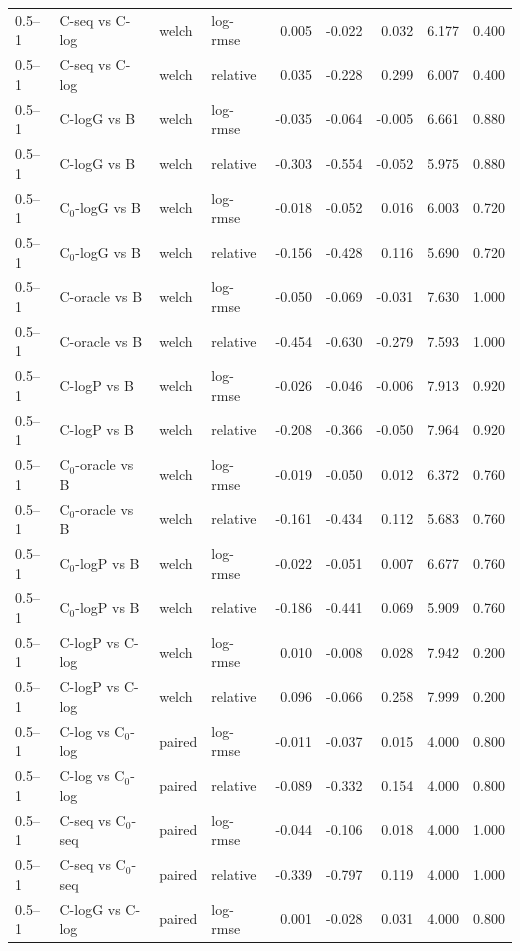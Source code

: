 \begin{longtable}{llllrrrrr}
0.5–1 & C-seq vs C-log & welch & log-rmse & 0.005 & -0.022 & 0.032 & 6.177 & 0.400 \\
0.5–1 & C-seq vs C-log & welch & relative & 0.035 & -0.228 & 0.299 & 6.007 & 0.400 \\
0.5–1 & C-logG vs B & welch & log-rmse & -0.035 & -0.064 & -0.005 & 6.661 & 0.880 \\
0.5–1 & C-logG vs B & welch & relative & -0.303 & -0.554 & -0.052 & 5.975 & 0.880 \\
0.5–1 & C$_0$-logG vs B & welch & log-rmse & -0.018 & -0.052 & 0.016 & 6.003 & 0.720 \\
0.5–1 & C$_0$-logG vs B & welch & relative & -0.156 & -0.428 & 0.116 & 5.690 & 0.720 \\
0.5–1 & C-oracle vs B & welch & log-rmse & -0.050 & -0.069 & -0.031 & 7.630 & 1.000 \\
0.5–1 & C-oracle vs B & welch & relative & -0.454 & -0.630 & -0.279 & 7.593 & 1.000 \\
0.5–1 & C-logP vs B & welch & log-rmse & -0.026 & -0.046 & -0.006 & 7.913 & 0.920 \\
0.5–1 & C-logP vs B & welch & relative & -0.208 & -0.366 & -0.050 & 7.964 & 0.920 \\
0.5–1 & C$_0$-oracle vs B & welch & log-rmse & -0.019 & -0.050 & 0.012 & 6.372 & 0.760 \\
0.5–1 & C$_0$-oracle vs B & welch & relative & -0.161 & -0.434 & 0.112 & 5.683 & 0.760 \\
0.5–1 & C$_0$-logP vs B & welch & log-rmse & -0.022 & -0.051 & 0.007 & 6.677 & 0.760 \\
0.5–1 & C$_0$-logP vs B & welch & relative & -0.186 & -0.441 & 0.069 & 5.909 & 0.760 \\
0.5–1 & C-logP vs C-log & welch & log-rmse & 0.010 & -0.008 & 0.028 & 7.942 & 0.200 \\
0.5–1 & C-logP vs C-log & welch & relative & 0.096 & -0.066 & 0.258 & 7.999 & 0.200 \\
0.5–1 & C-log vs C$_0$-log & paired & log-rmse & -0.011 & -0.037 & 0.015 & 4.000 & 0.800 \\
0.5–1 & C-log vs C$_0$-log & paired & relative & -0.089 & -0.332 & 0.154 & 4.000 & 0.800 \\
0.5–1 & C-seq vs C$_0$-seq & paired & log-rmse & -0.044 & -0.106 & 0.018 & 4.000 & 1.000 \\
0.5–1 & C-seq vs C$_0$-seq & paired & relative & -0.339 & -0.797 & 0.119 & 4.000 & 1.000 \\
0.5–1 & C-logG vs C-log & paired & log-rmse & 0.001 & -0.028 & 0.031 & 4.000 & 0.800 \\

\end{longtable}
